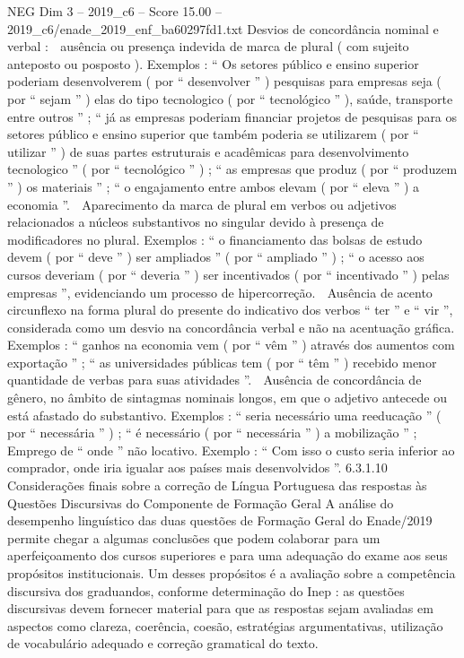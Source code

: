 \begin{textsample}{NEG Dim 3 – 2019\_c6 – Score 15.00 – 2019\_c6/enade\_2019\_enf\_ba60297fd1.txt}
Desvios de concordância nominal e verbal :  ausência ou presença indevida de marca de plural ( com sujeito anteposto ou posposto ).
Exemplos : “ Os setores público e ensino superior poderiam desenvolverem ( por “ desenvolver ” ) pesquisas para empresas seja ( por “ sejam ” ) elas do tipo tecnologico ( por “ tecnológico ” ), saúde, transporte entre outros ” ; “ já as empresas poderiam financiar projetos de pesquisas para os setores público e ensino superior que também poderia se utilizarem ( por “ utilizar ” ) de suas partes estruturais e acadêmicas para desenvolvimento tecnologico ” ( por “ tecnológico ” ) ; “ as empresas que produz ( por “ produzem ” ) os materiais ” ; “ o engajamento entre ambos elevam ( por “ eleva ” ) a economia ”.  Aparecimento da marca de plural em verbos ou adjetivos relacionados a núcleos substantivos no singular devido à presença de modificadores no plural.
Exemplos : “ o financiamento das bolsas de estudo devem ( por “ deve ” ) ser ampliados ” ( por “ ampliado ” ) ; “ o acesso aos cursos deveriam ( por “ deveria ” ) ser incentivados ( por “ incentivado ” ) pelas empresas ”, evidenciando um processo de hipercorreção.  Ausência de acento circunflexo na forma plural do presente do indicativo dos verbos “ ter ” e “ vir ”, considerada como um desvio na concordância verbal e não na acentuação gráfica.
Exemplos : “ ganhos na economia vem ( por “ vêm ” ) através dos aumentos com exportação ” ; “ as universidades públicas tem ( por “ têm ” ) recebido menor quantidade de verbas para suas atividades ”.  Ausência de concordância de gênero, no âmbito de sintagmas nominais longos, em que o adjetivo antecede ou está afastado do substantivo.
Exemplos : “ seria necessário uma reeducação ” ( por “ necessária ” ) ; “ é necessário ( por “ necessária ” ) a mobilização ” ;  Emprego de “ onde ” não locativo.
Exemplo : “ Com isso o custo seria inferior ao comprador, onde iria igualar aos países mais desenvolvidos ”. 6.3.1.10 Considerações finais sobre a correção de Língua Portuguesa das respostas às Questões Discursivas do Componente de Formação Geral A análise do desempenho linguístico das duas questões de Formação Geral do Enade/2019 permite chegar a algumas conclusões que podem colaborar para um aperfeiçoamento dos cursos superiores e para uma adequação do exame aos seus propósitos institucionais.
Um desses propósitos é a avaliação sobre a competência discursiva dos graduandos, conforme determinação do Inep : as questões discursivas devem fornecer material para que as respostas sejam avaliadas em aspectos como clareza, coerência, coesão, estratégias argumentativas, utilização de vocabulário adequado e correção gramatical do texto.

\end{textsample}

